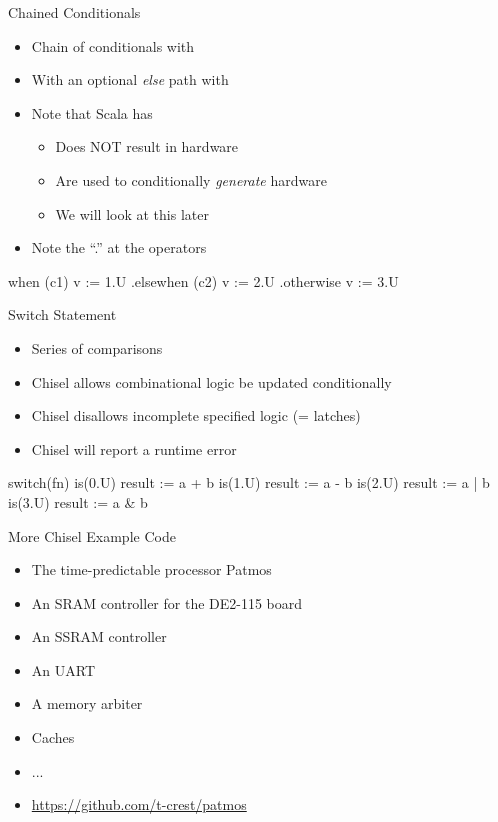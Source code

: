 \begin{frame}[fragile]{Chained Conditionals}
\begin{itemize}
\item Chain of conditionals with 
\item With an optional \emph{else} path with 
\item Note that Scala has 
\begin{itemize}
\item Does NOT result in hardware
\item Are used to conditionally \emph{generate} hardware
\item We will look at this later
\end{itemize}
\item Note the ``.'' at the operators
\end{itemize}
\begin{chisel}
  when (c1) { v := 1.U }
  .elsewhen (c2) { v := 2.U }
  .otherwise { v := 3.U }
\end{chisel}
\end{frame}

\begin{frame}[fragile]{Switch Statement}
\begin{itemize}
\item Series of comparisons
\item Chisel allows combinational logic be updated conditionally 
\item Chisel disallows incomplete specified logic (= latches)
\item Chisel will report a runtime error
\end{itemize}
\begin{chisel}
  switch(fn) {
    is(0.U) { result := a + b }
    is(1.U) { result := a - b }
    is(2.U) { result := a | b }
    is(3.U) { result := a & b }
  }
\end{chisel}
\end{frame}

\begin{frame}[fragile]{More Chisel Example Code}
\begin{itemize}
\item The time-predictable processor Patmos
\item An SRAM controller for the DE2-115 board
\item An SSRAM controller
\item An UART
\item A memory arbiter
\item Caches
\item ...
\item \url{https://github.com/t-crest/patmos}
\end{itemize}
\end{frame}


